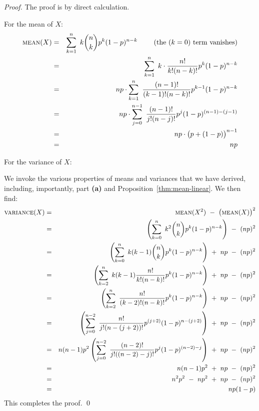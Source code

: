 \begin{proof}
The proof is by direct calculation.

\smallskip

 For the mean of $X$:
\begin{eqnarray*} 
\mbox{\sc mean}(X) & = &
\sum_{k=1}^n \ k {n \choose k} p^k (1-p)^{n-k} \ \ \ \ \ \ \ \mbox{(the $(k=0)$ term vanishes)} \\
  & = &
\sum_{k=1}^n \ k \cdot \frac{n!}{k! (n-k)!} p^k (1-p)^{n-k} \\
  & = &
np \cdot \sum_{k=1}^n \ \frac{(n-1)!}{(k-1)! (n-k)!} p^{k-1} (1-p)^{n-k} \\
  & = &
np \cdot \sum_{j=0}^{n-1} \ \frac{(n-1)!}{j! (n-j)!} p^{j} (1-p)^{(n-1)-(j-1)} \\
  & = &
np \cdot \big(p + (1-p) \big)^{n-1} \\
  & = &
np
\end{eqnarray*}

 For the variance of $X$:

We invoke the various properties of means and variances that we have derived, including, importantly, part {\bf (a)} and Proposition~\ref{thm:mean-linear}.  We then find:
\begin{eqnarray*} 
\mbox{\sc variance}(X) & = & 
\mbox{\sc mean}(X^2) \ - \  \big(\mbox{\sc mean}(X) \big)^2 \\
  & = &
\left( \sum_{k=0}^n \ k^2 {n \choose k} p^k (1-p)^{n-k} \right)
 \ - \ (np)^2  \\
  & = &
\left( \sum_{k=0}^n \ k(k-1) {n \choose k} p^k (1-p)^{n-k} \right)
 \ + \ np
 \ - \ (np)^2  \\
  & = &
\left( \sum_{k=2}^n \ k(k-1) \frac{n!}{k! (n-k)!} p^k (1-p)^{n-k} \right)
 \ + \ np
 \ - \ (np)^2  \\
  & = &
\left( \sum_{k=2}^n \ \frac{n!}{(k-2)! (n-k)!} p^k (1-p)^{n-k} \right)
 \ + \ np
 \ - \ (np)^2 \\
  & = &
\left( \sum_{j=0}^{n-2} \ \frac{n!}{j! (n-(j+2))!} p^{(j+2)} (1-p)^{n-(j+2)} \right)
 \ + \ np
 \ - \ (np)^2 \\
   & = &
n(n-1)p^2 \left( \sum_{j=0}^{n-2} \ \frac{(n-2)!}{j! ((n-2)-j)!} p^j (1-p)^{(n-2)-j} \right)
 \ + \ np
 \ - \ (np)^2 \\
     & = &
n(n-1)p^2  \ + \ np \ - \ (np)^2 \\
     & = &
n^2 p^2 \ - \ n p^2  \ + \ np \ - \ (np)^2 \\
     & = &
n p (1-p)
\end{eqnarray*}
This completes the proof. \qed
\end{proof}


